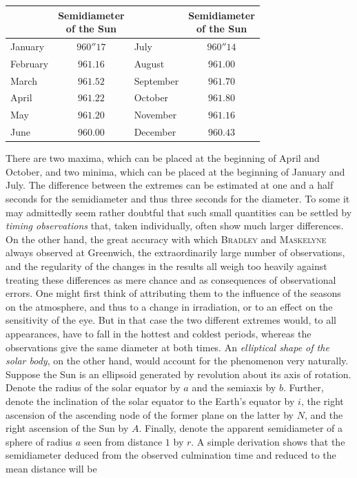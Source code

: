 \begin{center}\begin{tabular}{l|c||l|c}
&\shortstack{Semidiameter\\of the Sun}&&\shortstack{Semidiameter\\of the Sun}\\ \hline
January & $960''17$ & July & $960''14$ \\
February & $961.16$ & August & $961.00$ \\
March & $961.52$ & September & $961.70$ \\
April & $961.22$ & October & $961.80$ \\
May & $961.20$ & November & $961.16$ \\
June & $960.00$ & December & $960.43$ \\
\end{tabular}\end{center}

There are two maxima, which can be placed at the beginning of April and October, and two minima, which can be placed at the beginning of January and July. The difference between the extremes can be estimated at one and a half seconds for the semidiameter and thus three seconds for the diameter. To some it may admittedly seem rather doubtful that such small quantities can be settled by \emph{timing observations} that, taken individually, often show much larger differences. On the other hand, the great accuracy with which \textsc{Bradley} and \textsc{Maskelyne} always observed at Greenwich, the extraordinarily large number of observations, and the regularity of the changes in the results all weigh too heavily against treating these differences as mere chance and as consequences of observational errors. One might first think of attributing them to the influence of the seasons on the atmosphere, and thus to a change in irradiation, or to an effect on the sensitivity of the eye. But in that case the two different extremes would, to all appearances, have to fall in the hottest and coldest periods, whereas the observations give the same diameter at both times. An \emph{elliptical shape of the solar body}, on the other hand, would account for the phenomenon very naturally. Suppose the Sun is an ellipsoid generated by revolution about its axis of rotation. Denote the radius of the solar equator by $a$ and the semiaxis by $b$. Further, denote the inclination of the solar equator to the Earth’s equator by $i$, the right ascension of the ascending node of the former plane on the latter by $N$, and the right ascension of the Sun by $A$. Finally, denote the apparent semidiameter of a sphere of radius $a$ seen from distance $1$ by $r$. A simple derivation shows that the semidiameter deduced from the observed culmination time and reduced to the mean distance will be

